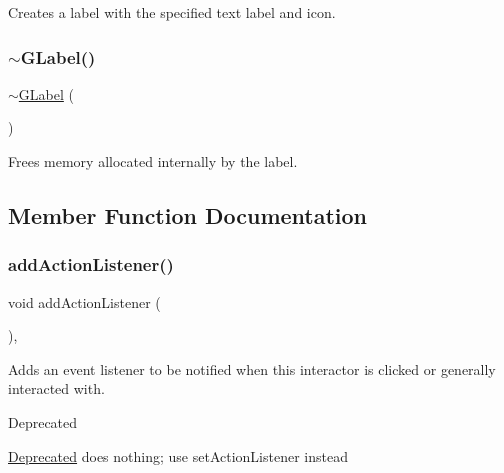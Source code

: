 Creates a label with the specified text label and icon. 

\mbox{\label{classsgl_1_1GLabel_a1d11ab4dd459b9a9b1f28410344cfc33}} 
\subsubsection{\texorpdfstring{$\sim$\+G\+Label()}{~GLabel()}}
{\footnotesize\ttfamily $\sim$\mbox{\hyperlink{classsgl_1_1GLabel}{G\+Label}} (\begin{DoxyParamCaption}{ }\end{DoxyParamCaption})\hspace{0.3cm}{\ttfamily [override]}}



Frees memory allocated internally by the label. 



\subsection{Member Function Documentation}
\mbox{\label{classsgl_1_1GInteractor_a02f20ea6edfa0671f31c4c648a253833}} 
\subsubsection{\texorpdfstring{add\+Action\+Listener()}{addActionListener()}}
{\footnotesize\ttfamily void add\+Action\+Listener (\begin{DoxyParamCaption}{ }\end{DoxyParamCaption})\hspace{0.3cm}{\ttfamily [virtual]}, {\ttfamily [inherited]}}



Adds an event listener to be notified when this interactor is clicked or generally interacted with. 

\begin{DoxyRefDesc}{Deprecated}
\item[\mbox{\hyperlink{deprecated__deprecated000006}{Deprecated}}]does nothing; use set\+Action\+Listener instead \end{DoxyRefDesc}
\mbox{\label{classsgl_1_1GObservable_a80cfa040459ff53594adbd6a51ec8f43}} 
